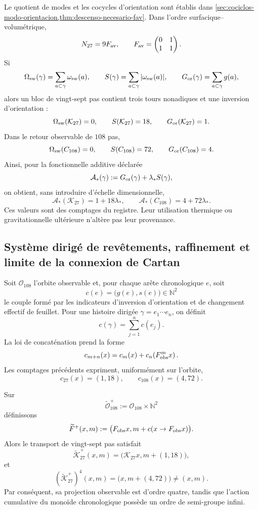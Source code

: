 Le quotient de modes et les cocycles d'orientation sont établis dans
\cref{sec:cociclos-modo-orientacion,thm:descenso-necesario-fav}. Dans l'ordre
surfacique--volumétrique,
\[
 N_{27}=9F_{\rm av},
 \qquad
 F_{\rm av}=
 \begin{pmatrix}0&1\\1&1\end{pmatrix}.
\]
Si
\[
 \Omega_{\rm sw}(\gamma)=\sum_{a\subset\gamma}\omega_{\rm sw}(a),
 \qquad
 S(\gamma)=\sum_{a\subset\gamma}|\omega_{\rm sw}(a)|,
 \qquad
 G_{\rm or}(\gamma)=\sum_{a\subset\gamma}g(a),
\]
alors un bloc de vingt-sept pas contient trois tours nonadiques et une
inversion d'orientation :
\[
 \Omega_{\rm sw}(\mathcal K_{27})=0,\qquad
 S(\mathcal K_{27})=18,\qquad
 G_{\rm or}(\mathcal K_{27})=1.
\]
Dans le retour observable de \(108\) pas,
\[
 \Omega_{\rm sw}(C_{108})=0,\qquad
 S(C_{108})=72,\qquad
 G_{\rm or}(C_{108})=4.
\]
Ainsi, pour la fonctionnelle additive déclarée
\[
 \mathcal A_\ast(\gamma)
 :=G_{\rm or}(\gamma)+\lambda_\ast S(\gamma),
\]
on obtient, sans introduire d'échelle dimensionnelle,
\[
 \mathcal A_\ast(\mathcal K_{27})=1+18\lambda_\ast,
 \qquad
 \mathcal A_\ast(C_{108})=4+72\lambda_\ast.
\]
Ces valeurs sont des comptages du registre. Leur utilisation thermique ou
gravitationnelle ultérieure n'altère pas leur provenance.

\subsection{Système dirigé de revêtements, raffinement et limite de la connexion de Cartan}
\label{sec:cobertura-acumulativa-dirigida}

Soit \(\mathcal O_{108}\) l'orbite observable et, pour chaque arête chronologique
\(e\), soit
\[
 c(e)=\bigl(g(e),s(e)\bigr)\in\mathbb N^2
\]
le couple formé par les indicateurs d'inversion d'orientation et de changement
effectif de feuillet. Pour une histoire dirigée
\(\gamma=e_1\cdots e_n\), on définit
\[
 c(\gamma)=\sum_{j=1}^{n}c(e_j).
\]
La loi de concaténation prend la forme
\[
 c_{m+n}(x)
 =c_m(x)+c_n\!\left(F_{\rm obs}^{m}x\right).
\]
Les comptages précédents expriment, uniformément sur l'orbite,
\[
 c_{27}(x)=(1,18),
 \qquad
 c_{108}(x)=(4,72).
\]

\begin{theorem}
\label{thm:cobertura-acumulativa-dirigida}
Sur
\[
 \widetilde{\mathcal O}_{108}^{+}
 :=\mathcal O_{108}\times\mathbb N^2
\]
définissons
\[
 \widetilde F^{+}(x,m)
 :=\bigl(F_{\rm obs}x,m+c(x\to F_{\rm obs}x)\bigr).
\]
Alors le transport de vingt-sept pas satisfait
\[
 \widetilde{\mathcal K}_{27}^{+}(x,m)
 =\bigl(\mathcal K_{27}x,m+(1,18)\bigr),
\]
et
\[
 \left(\widetilde{\mathcal K}_{27}^{+}\right)^4(x,m)
 =\bigl(x,m+(4,72)\bigr)\neq(x,m).
\]
Par conséquent, sa projection observable est d'ordre quatre, tandis que
l'action cumulative du monoïde chronologique possède un ordre de semi-groupe infini.
\end{theorem}

